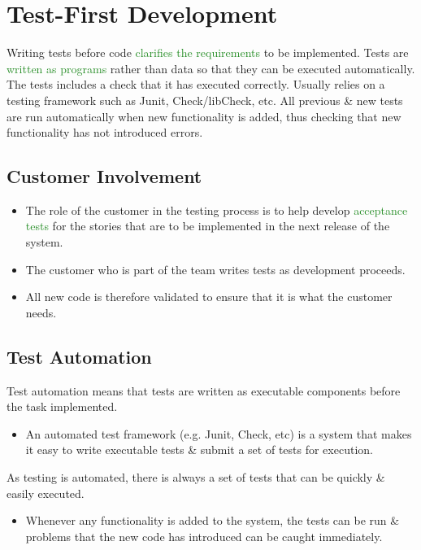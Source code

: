 \documentclass{report}
\newcommand{\textg}[1]{\textcolor{ForestGreen}{#1}}
\begin{document}
\section{Test-First Development}
\noindent Writing tests before code \textg{clarifies the requirements} to be implemented. Tests are \textg{written as programs} rather than data so that they can be executed automatically. The tests includes a check that it has executed correctly. Usually relies on a testing framework such as Junit, Check/libCheck, etc. All previous \& new tests are run automatically when new functionality is added, thus checking that new functionality has not introduced errors.

\subsection{Customer Involvement}
\begin{itemize}
  \item The role of the customer in the testing process is to help develop \textg{acceptance tests} for the stories that are to be implemented in the next release of the system.
  \item The customer who is part of the team writes tests as development proceeds.
  \item All new code is therefore validated to ensure that it is what the customer needs.
\end{itemize}

\subsection{Test Automation}
\noindent Test automation means that tests are written as executable components before the task implemented.
\begin{itemize}
  \item An automated test framework (e.g. Junit, Check, etc) is a system that makes it easy to write executable tests \& submit a set of tests for execution.
\end{itemize}
As testing is automated, there is always a set of tests that can be quickly \& easily executed.
\begin{itemize}
  \item Whenever any functionality is added to the system, the tests can be run \& problems that the new code has introduced can be caught immediately.
\end{itemize}
\end{document}
